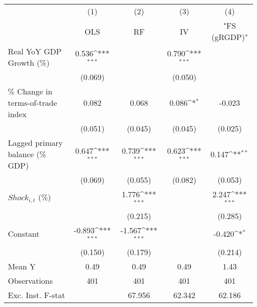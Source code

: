 {
\def\sym#1{\ifmmode^{#1}\else\(^{#1}\)\fi}
\begin{tabular}{l*{4}{c}}
\toprule
                    &\multicolumn{1}{c}{(1)}&\multicolumn{1}{c}{(2)}&\multicolumn{1}{c}{(3)}&\multicolumn{1}{c}{(4)}\\
                    &\multicolumn{1}{c}{OLS}&\multicolumn{1}{c}{RF}&\multicolumn{1}{c}{IV}&\multicolumn{1}{c}{ "FS (gRGDP)" }\\
\midrule
Real YoY GDP Growth (\%)&       0.536\sym{***}&                     &       0.790\sym{***}&                     \\
                    &     (0.069)         &                     &     (0.050)         &                     \\
\addlinespace
\% Change in terms-of-trade index&       0.082         &       0.068         &       0.086\sym{*}  &      -0.023         \\
                    &     (0.051)         &     (0.045)         &     (0.045)         &     (0.025)         \\
\addlinespace
Lagged primary balance (\% GDP)&       0.647\sym{***}&       0.739\sym{***}&       0.623\sym{***}&       0.147\sym{**} \\
                    &     (0.069)         &     (0.055)         &     (0.082)         &     (0.053)         \\
\addlinespace
$ Shock_{i,t}$ (\%) &                     &       1.776\sym{***}&                     &       2.247\sym{***}\\
                    &                     &     (0.215)         &                     &     (0.285)         \\
\addlinespace
Constant            &      -0.893\sym{***}&      -1.567\sym{***}&                     &      -0.420\sym{*}  \\
                    &     (0.150)         &     (0.179)         &                     &     (0.214)         \\
\midrule
Mean Y              &        0.49         &        0.49         &        0.49         &        1.43         \\
Observations        &         401         &         401         &         401         &         401         \\
Exc. Inst. F-stat   &                     &      67.956         &      62.342         &      62.186         \\
\bottomrule
\end{tabular}
}
